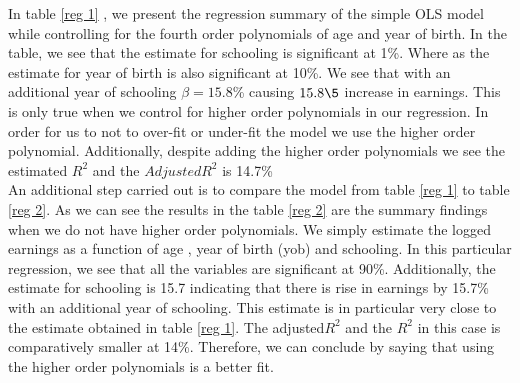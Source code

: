 \documentclass[a4paper,12pt,oneside,English]{article}
\begin{document}
In table \ref{reg 1} , we present the regression summary of the simple OLS model while controlling for the fourth order polynomials of age and year of birth. In the table, we see that the estimate for schooling is significant at 1\%. Where as the estimate for year of birth is also significant at 10\%. We see that with an additional year of schooling $\beta = 15.8$\% causing $15.8\5$ increase in earnings. This is only true when we control for higher order polynomials in our regression. In order for us to not to over-fit or under-fit the model we use the higher order polynomial. Additionally, despite adding the higher order polynomials we see the estimated $R^2$ and the $Adjusted R^2$  is 14.7\%\\

An additional step carried out is to compare the model from table \ref{reg 1} to table \ref{reg 2}. As we can see the results in the table \ref{reg 2}
are the summary findings when we do not have higher order polynomials. We simply estimate the logged earnings as a function of age , year of birth (yob) and schooling. In this particular regression, we see that all the variables are significant at 90\%. Additionally, the estimate for schooling is 15.7 indicating that there is rise in earnings by 15.7\% with an additional year of schooling. This estimate is in particular very close to the estimate obtained in table \ref{reg 1}. The adjusted$R^2$ and the $R^2$ in this case is comparatively smaller at 14\%. Therefore, we can conclude by saying that using the higher order polynomials is a better fit.\\
\end{document}
